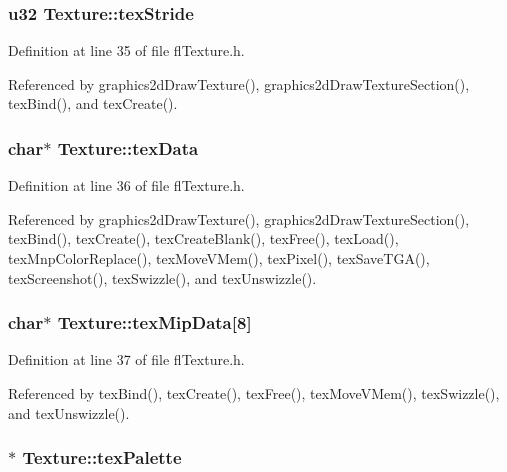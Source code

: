\subsubsection{\setlength{\rightskip}{0pt plus 5cm}u32 {\bf Texture::tex\-Stride}}\label{structTexture_2d7654a07b6ea609b806fd719d7fd81b}




Definition at line 35 of file fl\-Texture.h.

Referenced by graphics2d\-Draw\-Texture(), graphics2d\-Draw\-Texture\-Section(), tex\-Bind(), and tex\-Create().
\subsubsection{\setlength{\rightskip}{0pt plus 5cm}char$\ast$ {\bf Texture::tex\-Data}}\label{structTexture_4384d0e3734c3a45f6ebc36f6738962d}




Definition at line 36 of file fl\-Texture.h.

Referenced by graphics2d\-Draw\-Texture(), graphics2d\-Draw\-Texture\-Section(), tex\-Bind(), tex\-Create(), tex\-Create\-Blank(), tex\-Free(), tex\-Load(), tex\-Mnp\-Color\-Replace(), tex\-Move\-VMem(), tex\-Pixel(), tex\-Save\-TGA(), tex\-Screenshot(), tex\-Swizzle(), and tex\-Unswizzle().
\subsubsection{\setlength{\rightskip}{0pt plus 5cm}char$\ast$ {\bf Texture::tex\-Mip\-Data}[8]}\label{structTexture_05ed58a762e35e97b1a65bde830aee6c}




Definition at line 37 of file fl\-Texture.h.

Referenced by tex\-Bind(), tex\-Create(), tex\-Free(), tex\-Move\-VMem(), tex\-Swizzle(), and tex\-Unswizzle().
\subsubsection{$\ast$ {\bf Texture::tex\-Palette}}\label{structTexture_01d7cb5c9b302dea1b79112f1cf1cb37}




